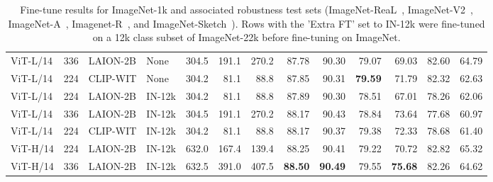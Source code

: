 \begin{appendix}
\begin{table}
\begin{tabular}{llllrrrrrrrrr}
ViT-L/14 &     336 & LAION-2B &     None &      304.5 & 191.1 &    270.2 &              87.78 &   90.30 & 79.07 & 69.03 & 82.60 &     64.79 \\
ViT-L/14 &     224 & CLIP-WIT &     None &      304.2 &  81.1 &     88.8 &              87.85 &   90.31 & \textbf{79.59} & 71.79 & 82.32 &     62.63 \\
ViT-L/14 &     224 & LAION-2B &   IN-12k &      304.2 &  81.1 &     88.8 &              87.89 &   90.30 & 78.51 & 67.01 & 78.26 &     62.06 \\
ViT-L/14 &     336 & LAION-2B &   IN-12k &      304.5 & 191.1 &    270.2 &              88.17 &   90.43 & 78.84 & 73.64 & 77.68 &     60.97 \\
ViT-L/14 &     224 & CLIP-WIT &   IN-12k &      304.2 &  81.1 &     88.8 &              88.17 &   90.37 & 79.38 & 72.33 & 78.68 &     61.40 \\
ViT-H/14 &     224 & LAION-2B &   IN-12k &      632.0 & 167.4 &    139.4 &              88.25 &   90.41 & 79.22 & 70.72 & 82.82 &     65.32 \\
ViT-H/14 &     336 & LAION-2B &   IN-12k &      632.5 & 391.0 &    407.5 &              \textbf{88.50} &   \textbf{90.49} & 79.55 & \textbf{75.68} & 82.26 &     64.62 \\
\bottomrule
\end{tabular}
\caption{Fine-tune results for ImageNet-1k and associated robustness test sets (ImageNet-ReaL~\citep{beyer2020we}, ImageNet-V2~\citep{pmlr-v97-recht19a}, ImageNet-A~\citep{imageneta}, Imagenet-R~\citep{imagenetr}, and ImageNet-Sketch~\citep{imagenetsketch}). Rows with the 'Extra FT' set to IN-12k were fine-tuned on a 12k class subset of ImageNet-22k before fine-tuning on ImageNet.}
\label{table:finetune_results}
\end{table}



\end{appendix}
